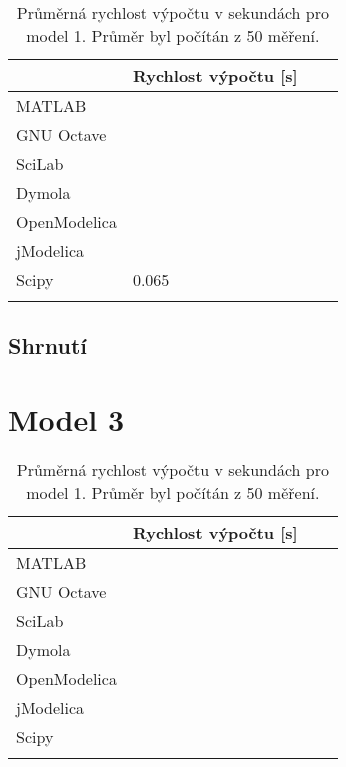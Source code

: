 \begin{table}[ht]
\centering
\begin{tabular}{|l|l|l|l|}
\hline
             & Rychlost výpočtu {[}s{]} &  &  \\ \hline
MATLAB       &                          &  &  \\ \hline
GNU Octave   &                          &  &  \\ \hline
SciLab       &                          &  &  \\ \hline
Dymola       &                          &  &  \\ \hline
OpenModelica &                          &  &  \\ \hline
jModelica    &                          &  &  \\ \hline
Scipy        &       0.065              &  &  \\ \hline
             &                          &  &  \\ \hline
\end{tabular}
\caption{Průměrná rychlost výpočtu v sekundách pro model 1. Průměr byl počítán z 50 měření.}
\label{tab:kruh-tabulka}
\end{table}

\subsection{Shrnutí}

\section{Model 3}
\label{srovnani-tuhy}


\begin{table}[ht]
\centering
\begin{tabular}{|l|l|l|l|}
\hline
             & Rychlost výpočtu {[}s{]} &  &  \\ \hline
MATLAB       &                          &  &  \\ \hline
GNU Octave   &                          &  &  \\ \hline
SciLab       &                          &  &  \\ \hline
Dymola       &                          &  &  \\ \hline
OpenModelica &                          &  &  \\ \hline
jModelica    &                          &  &  \\ \hline
Scipy        &                          &  &  \\ \hline
             &                          &  &  \\ \hline
\end{tabular}
\caption{Průměrná rychlost výpočtu v sekundách pro model 1. Průměr byl počítán z 50 měření.}
\label{tab:tuhy-tabulka}
\end{table}

